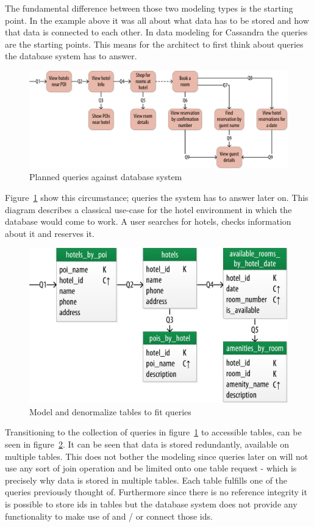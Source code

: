The fundamental difference between those two modeling types is the starting point. In the example above it was all about what data has to be stored and how that data is connected to each other.
In data modeling for Cassandra the queries are the starting points. This means for the architect to first think about queries the database system has to answer.

\begin{figure}[H]
    \centering
    \includegraphics[width=0.75\columnwidth]{img/model_example_queries_step2.png}
    \caption{Planned queries against database system \autocite{cassandra_oreilly}}
    \label{fig:cassandra:model_data2}
\end{figure}

Figure~\ref{fig:cassandra:model_data2} show this circumstance; queries the system has to answer later on. This diagram describes a classical use-case for the hotel environment in which the database would come to work. A user searches for hotels, checks information about it and reserves it.

\begin{figure}[H]
    \centering
    \includegraphics[width=0.75\columnwidth]{img/model_example_chebotko_step3.png}
    \caption{Model and denormalize tables to fit queries \autocite{cassandra_oreilly}}
    \label{fig:cassandra:model_data3}
\end{figure}

Transitioning to the collection of queries in figure~\ref{fig:cassandra:model_data2} to accessible tables, can be seen in figure~\ref{fig:cassandra:model_data3}. It can be seen that data is stored redundantly, available on multiple tables. This does not bother the modeling since queries later on will not use any sort of join operation and be limited onto one table request - which is precisely why data is stored in multiple tables. Each table fulfills one of the queries previously thought of. Furthermore since there is no reference integrity it is possible to store ids in tables but the database system does not provide any functionality to make use of and / or connect those ids.

